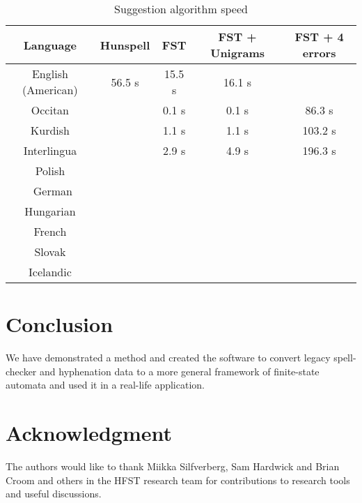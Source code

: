 \documentclass[a4paper,runningheads]{llncs}
\begin{document}
\begin{table}[tbp]
  \caption{Suggestion algorithm speed}
  \label{table:error-analysis}
  \centering
  \begin{tabular}{ccccc}
    \hline
    \textbf{Language} & \textbf{Hunspell} & \textbf{FST} & \textbf{FST + Unigrams} & \textbf{FST + 4 errors} \\
    \hline
    \hline
    English (American) & 56.5 s & 15.5 s & 16.1 s &  \\
    Occitan & & 0.1 s & 0.1 s & 86.3 s \\
    Kurdish & & 1.1 s & 1.1 s & 103.2 s \\
    Interlingua & & 2.9 s & 4.9 s & 196.3 s \\
    Polish & & & & \\\
    German & & & & \\
    Hungarian & & & & \\
    French & \\
    Slovak & \\
    Icelandic & \\
    \hline
  \end{tabular}
\end{table}

\section{Conclusion}

We have demonstrated a method and created the software to convert legacy
spell-checker and hyphenation data to a more general framework of
finite-state automata and used it in a real-life application.

\section*{Acknowledgment}

The authors would like to thank Miikka Silfverberg, Sam Hardwick and Brian
Croom and others in the HFST research team for contributions to research tools
and useful discussions.




\end{document}
